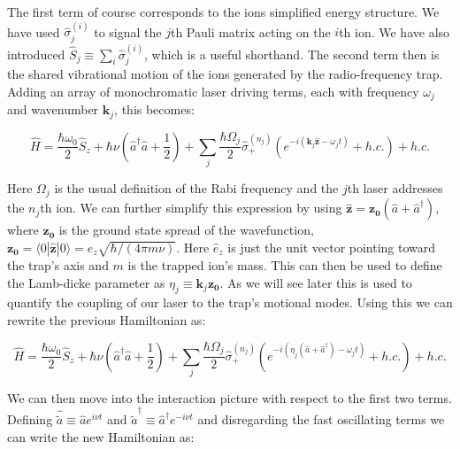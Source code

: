 \documentclass[12pt,twoside]{report}
\begin{document}
The first term of course corresponds to the ions simplified energy structure. We have used $\hat{\sigma}_j^{\left(i\right)}$ to signal the $j$th Pauli matrix acting on the $i$th ion. We have also introduced $\hat{S}_j \equiv \sum_{i} \hat{\sigma}_j^{\left(i\right)}$, which is a useful shorthand. The second term then is the shared vibrational motion of the ions generated by the radio-frequency trap. Adding an array of monochromatic laser driving terms, each with frequency $\omega_j$ and wavenumber $\mathbf{k}_j$, this becomes:

\begin{equation}
	\hat{H} = \frac{\hbar \omega_0}{2}\hat{S}_z + \hbar\nu\left(\hat{a}^\dagger\hat{a} + \frac{1}{2}\right) + \sum_{j}\frac{\hbar\Omega_j}{2}\hat{\sigma}^{\left(n_j\right)}_+\left(e^{-i\left(\mathbf{k}_j\mathbf{\hat{z}} - \omega_jt\right)} + h.c.\right) + h.c.
	\label{eq:RF_Trap_H_driven}
\end{equation}

Here $\Omega_j$ is the usual definition of the Rabi frequency \cite{Foot} and the $j$th laser addresses the $n_j$th ion. We can further simplify this expression by using $\mathbf{\hat{z}} = \mathbf{z_0}\left(\hat{a} + \hat{a}^\dagger\right)$, where $\mathbf{z_0}$ is the ground state spread of the wavefunction, $\mathbf{z_0} = \langle0|\mathbf{\hat{z}}|0\rangle=\hat{e}_z\sqrt{\hbar/(4\pi m\nu)}$. Here $\hat{e}_z$ is just the unit vector pointing toward the trap's axis and $m$ is the trapped ion's mass\cite{Experiment_setup}. This can then be used to define the Lamb-dicke parameter\cite{Sideband_cooling_penning_trap} as $\eta_j\equiv\mathbf{k}_j\mathbf{z_0}$. As we will see later this is used to quantify the coupling of our laser to the trap's motional modes. Using this we can rewrite the previous Hamiltonian as:

\begin{equation}
	\hat{H} = \frac{\hbar \omega_0}{2}\hat{S}_z + \hbar\nu\left(\hat{a}^\dagger\hat{a} + \frac{1}{2}\right) + \sum_{j}\frac{\hbar\Omega_j}{2}\hat{\sigma}^{\left(n_j\right)}_+\left(e^{-i\left(\eta_j\left(\hat{a} + \hat{a}^\dagger\right) - \omega_jt\right)} + h.c.\right) + h.c.
	\label{eq:RF_Trap_H_driven_LD_param}
\end{equation}

We can then move into the interaction picture with respect to the first two terms. Defining $\hat{\tilde{a}}\equiv\hat{a}e^{i\nu t}$ and $\hat{\tilde{a}}^\dagger\equiv\hat{a}^\dagger e^{-i\nu t}$ and disregarding the fast oscillating terms we can write the new Hamiltonian as:
\end{document}
